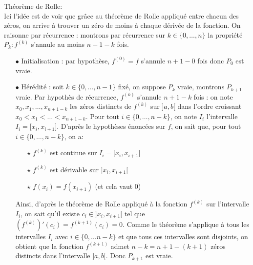 \documentclass[a4paper, 11pt,reqno]{article}
\begin{document}
\begin{correction}  \; Th\'eor\`eme de Rolle:\\
	Ici l'id\'ee est de voir que gr\^ace au th\'eor\`eme de Rolle appliqu\'e entre chacun des z\'eros, on arrive \`a trouver un z\'ero de moins \`a chaque d\'eriv\'ee de la fonction. On raisonne par r\'ecurrence : montrons par r\'ecurrence sur $k \in \{0, \ldots, n\}$ la propri\'et\'e $P_k : f^{(k)}$ s'annule au moins $n+1-k$ fois.
	\begin{itemize}
		\item[$\bullet$] Initialisation : par hypoth\`ese, $f^{(0)}=f$ s'annule $n+1-0$ fois donc $P_0$ est vraie.
		\item[$\bullet$] H\'er\'edit\'e : soit $k \in \{0, \ldots, n-1\}$ fix\'e, on suppose $P_k$ vraie, montrons $P_{k+1}$ vraie.
		      \noindent
		      Par hypoth\`es de r\'ecurrence, $f^{(k)}$ s'annule $n+1-k$ fois : on note $x_0,x_1,\dots, x_{n+1-k}$ les z\'eros distincts de $f^{(k)}$ sur $\rbrack a,b\lbrack$ dans l'ordre croissant $x_0<x_1<\dots<x_{n+1-k}$.
		      Pour tout $i\in\lbrace 0,\dots,n-k\rbrace$, on note $I_i$ l'intervalle $I_i=\lbrack x_i,x_{i+1}\rbrack$. D'apr\`es le hypoth\`eses \'enonc\'ees sur $f$, on sait que, pour tout $i\in\lbrace 0,\dots,n-k\rbrace$, on a:
		      \begin{itemize}
			      \item[$\star$] $f^{(k)}$ est continue sur $I_i=\lbrack x_i,x_{i+1}\rbrack$
			      \item[$\star$]  $f^{(k)}$ est d\'erivable sur $\rbrack x_i,x_{i+1}\lbrack$
			      \item[$\star$]  $f(x_i)=f(x_{i+1})$ (et cela vaut 0)
		      \end{itemize}
		      Ainsi, d'apr\`es le th\'eor\`eme de Rolle appliqu\'e \`a la fonction $f^{(k)}$ sur l'intervalle $I_i$, on sait qu'il existe $c_i\in\rbrack x_i,x_{i+1}\lbrack$ tel que $(f^{(k)})'(c_i) = f^{(k+1)}(c_i)=0$. Comme le th\'eor\`eme s'applique \`a tous les intervalles $I_i$ avec $i\in\lbrace 0,\dots n-k\rbrace$ et que tous ces intervalles sont disjoints, on obtient que la fonction $f^{(k+1)}$ admet $n-k=n+1-(k+1)$ z\'eros distincts dans l'intervalle $\rbrack a,b\lbrack$.
		      Donc $P_{k+1}$ est vraie.
	\end{itemize}

\end{correction}
\end{document}
